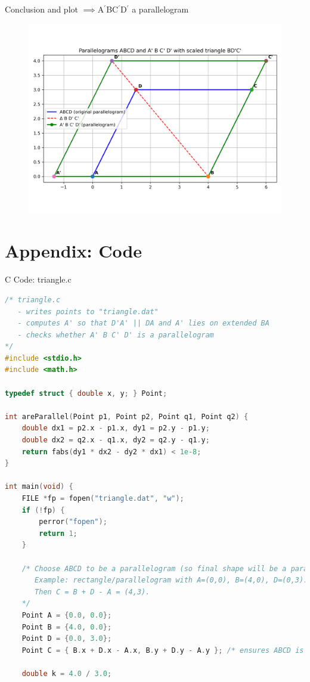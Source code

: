 \documentclass{beamer}
\numberwithin{equation}{section}
\theoremstyle{remark}
\begin{document}
\begin{frame}{Conclusion and plot}
$\implies$A$^{\prime}$BC$^{\prime}$D$^{\prime}$ a parallelogram
\begin{figure}[H]
    \centering
    \includegraphics[width=1.0\columnwidth]{figs/01.png}
    \label{fig-1}
\end{figure}
\end{frame}


\section*{Appendix: Code}

\begin{frame}[fragile]{C Code: triangle.c}
\begin{lstlisting}[language=C]
/* triangle.c
   - writes points to "triangle.dat"
   - computes A' so that D'A' || DA and A' lies on extended BA
   - checks whether A' B C' D' is a parallelogram
*/
#include <stdio.h>
#include <math.h>

typedef struct { double x, y; } Point;

int areParallel(Point p1, Point p2, Point q1, Point q2) {
    double dx1 = p2.x - p1.x, dy1 = p2.y - p1.y;
    double dx2 = q2.x - q1.x, dy2 = q2.y - q1.y;
    return fabs(dy1 * dx2 - dy2 * dx1) < 1e-8;
}

int main(void) {
    FILE *fp = fopen("triangle.dat", "w");
    if (!fp) {
        perror("fopen");
        return 1;
    }

    /* Choose ABCD to be a parallelogram (so final shape will be a parallelogram).
       Example: rectangle/parallelogram with A=(0,0), B=(4,0), D=(0,3).
       Then C = B + D - A = (4,3).
    */
    Point A = {0.0, 0.0};
    Point B = {4.0, 0.0};
    Point D = {0.0, 3.0};
    Point C = { B.x + D.x - A.x, B.y + D.y - A.y }; /* ensures ABCD is parallelogram */

    double k = 4.0 / 3.0;
\end{lstlisting}
\end{frame}
\end{document}
